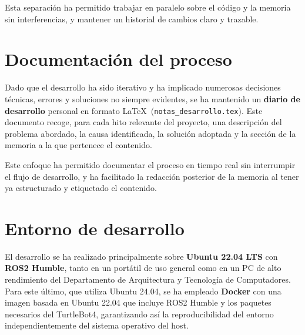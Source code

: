 Esta separación ha permitido trabajar en paralelo sobre el código y la memoria sin interferencias, y mantener un historial de cambios claro y trazable.

\section{Documentación del proceso}

Dado que el desarrollo ha sido iterativo y ha implicado numerosas decisiones técnicas, errores y soluciones no siempre evidentes, se ha mantenido un \textbf{diario de desarrollo} personal en formato \LaTeX\ (\texttt{notas\_desarrollo.tex}). Este documento recoge, para cada hito relevante del proyecto, una descripción del problema abordado, la causa identificada, la solución adoptada y la sección de la memoria a la que pertenece el contenido.

Este enfoque ha permitido documentar el proceso en tiempo real sin interrumpir el flujo de desarrollo, y ha facilitado la redacción posterior de la memoria al tener ya estructurado y etiquetado el contenido.

\section{Entorno de desarrollo}

El desarrollo se ha realizado principalmente sobre \textbf{Ubuntu 22.04 LTS} con \textbf{ROS2 Humble}, tanto en un portátil de uso general como en un PC de alto rendimiento del Departamento de Arquitectura y Tecnología de Computadores. Para este último, que utiliza Ubuntu 24.04, se ha empleado \textbf{Docker} con una imagen basada en Ubuntu 22.04 que incluye ROS2 Humble y los paquetes necesarios del TurtleBot4, garantizando así la reproducibilidad del entorno independientemente del sistema operativo del host.
